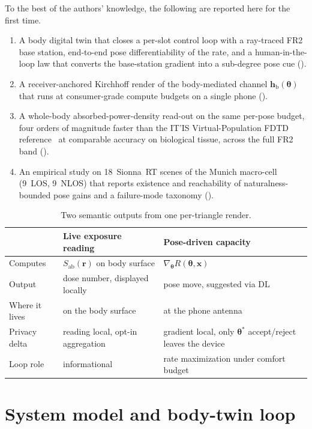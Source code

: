 \documentclass[journal,twocolumn,10pt]{IEEEtran}
\theoremstyle{plain}
\theoremstyle{definition}
\theoremstyle{remark}
\newcommand{\rr}{\mathbf{r}}
\newcommand{\xx}{\mathbf{x}}
\newcommand{\Sab}{S_{\mathrm{ab}}}
\newcommand{\thetab}{\bm{\theta}}
\newcommand{\hbody}{\bm{h}_{\mathrm{b}}}
\begin{document}
To the best of the authors' knowledge, the following are reported here
for the first time.
\begin{enumerate}
\item A body digital twin that closes a per-slot control loop with a
ray-traced FR2 base station, end-to-end pose differentiability of the
rate, and a human-in-the-loop law that converts the base-station
gradient into a sub-degree pose cue
().
\item A receiver-anchored Kirchhoff render of the body-mediated
channel $\hbody(\thetab)$ that runs at consumer-grade compute budgets
on a single phone ().
\item A whole-body absorbed-power-density read-out on the same per-pose
budget, four orders of magnitude faster than the IT'IS
Virtual-Population FDTD reference~\cite{Christ2010VF} at comparable
accuracy on biological tissue, across the full FR2
band ().
\item An empirical study on 18~Sionna~RT scenes of the Munich
macro-cell (9~LOS, 9~NLOS) that reports existence and reachability of
naturalness-bounded pose gains and a failure-mode taxonomy
().
\end{enumerate}

\begin{table}[!t]
\caption{Two semantic outputs from one per-triangle render.}
\label{tab:two-products}
\centering\small
\begin{tabular}{@{}p{}p{}p{}@{}}
\toprule
& \textbf{Live exposure reading} & \textbf{Pose-driven capacity} \\
\midrule
Computes & $\Sab(\rr)$ on body surface & $\nabla_{\thetab} R(\thetab,\xx)$ \\
Output & dose number, displayed locally & pose move, suggested via DL \\
Where it lives & on the body surface & at the phone antenna \\
Privacy delta & reading local, opt-in aggregation & gradient local, only $\thetab^{*}$ accept/reject leaves the device \\
Loop role & informational & rate maximization under comfort budget \\
\bottomrule
\end{tabular}
\end{table}


\section{System model and body-twin loop}\label{sec:arch}
\end{document}
